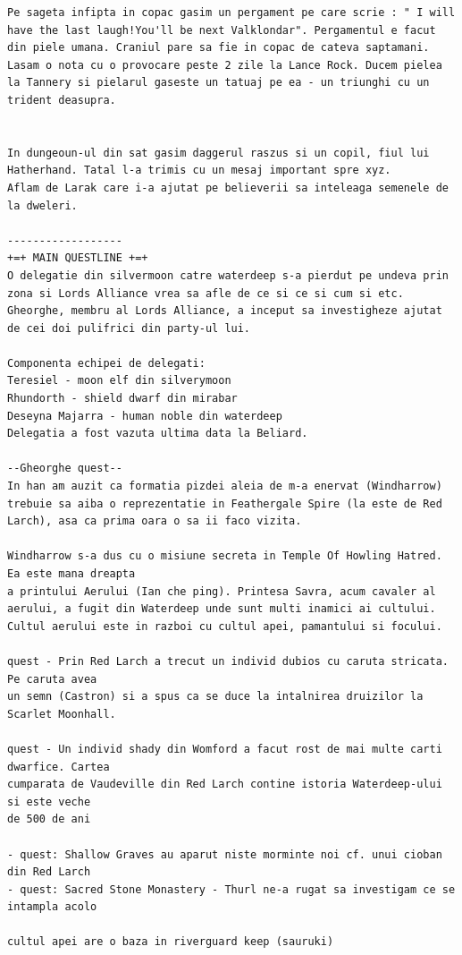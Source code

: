 \documentclass[12pt,twoside]{book}
\begin{document}
\begin{verbatim}
Pe sageta infipta in copac gasim un pergament pe care scrie : " I will have the last laugh!You'll be next Valklondar". Pergamentul e facut din piele umana. Craniul pare sa fie in copac de cateva saptamani. Lasam o nota cu o provocare peste 2 zile la Lance Rock. Ducem pielea la Tannery si pielarul gaseste un tatuaj pe ea - un triunghi cu un trident deasupra.


In dungeoun-ul din sat gasim daggerul raszus si un copil, fiul lui Hatherhand. Tatal l-a trimis cu un mesaj important spre xyz.
Aflam de Larak care i-a ajutat pe believerii sa inteleaga semenele de la dweleri.

------------------
+=+ MAIN QUESTLINE +=+
O delegatie din silvermoon catre waterdeep s-a pierdut pe undeva prin zona si Lords Alliance vrea sa afle de ce si ce si cum si etc. 
Gheorghe, membru al Lords Alliance, a inceput sa investigheze ajutat de cei doi pulifrici din party-ul lui.

Componenta echipei de delegati:
Teresiel - moon elf din silverymoon
Rhundorth - shield dwarf din mirabar
Deseyna Majarra - human noble din waterdeep
Delegatia a fost vazuta ultima data la Beliard.

--Gheorghe quest--
In han am auzit ca formatia pizdei aleia de m-a enervat (Windharrow) trebuie sa aiba o reprezentatie in Feathergale Spire (la este de Red Larch), asa ca prima oara o sa ii faco vizita. 

Windharrow s-a dus cu o misiune secreta in Temple Of Howling Hatred. Ea este mana dreapta
a printului Aerului (Ian che ping). Printesa Savra, acum cavaler al aerului, a fugit din Waterdeep unde sunt multi inamici ai cultului.
Cultul aerului este in razboi cu cultul apei, pamantului si focului.

quest - Prin Red Larch a trecut un individ dubios cu caruta stricata. Pe caruta avea 
un semn (Castron) si a spus ca se duce la intalnirea druizilor la Scarlet Moonhall.

quest - Un individ shady din Womford a facut rost de mai multe carti dwarfice. Cartea
cumparata de Vaudeville din Red Larch contine istoria Waterdeep-ului si este veche 
de 500 de ani

- quest: Shallow Graves au aparut niste morminte noi cf. unui cioban din Red Larch
- quest: Sacred Stone Monastery - Thurl ne-a rugat sa investigam ce se intampla acolo

cultul apei are o baza in riverguard keep (sauruki)
\end{verbatim}

\newpage
\end{document}
